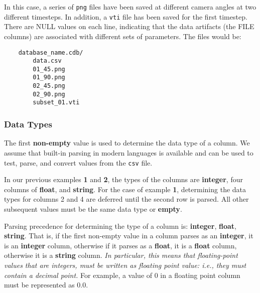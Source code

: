 \noindent
In this case, a series of \texttt{\small png} files have been saved at different
camera angles at two different timesteps. In addition, a \texttt{\small vti}
file has been saved for the first timestep. There are NULL values on each line,
indicating that the data artifacts (the FILE columns) are associated with
different sets of parameters. The files would be:

\begin{verbatim}
    database_name.cdb/
        data.csv
        01_45.png
        01_90.png
        02_45.png
        02_90.png
        subset_01.vti
\end{verbatim}

\subsubsection{Data Types}

The first \textbf{non-empty} value is used to determine the data type of a
column.  We assume that built-in parsing in modern languages is available and
can be used to test, parse, and convert values from the \texttt{\small csv}
file.

In our previous examples {\bf 1} and {\bf 2}, the types of the columns are 
\textbf{integer}, four columns of \textbf{float}, and \textbf{string}. For
the case of example {\bf 1}, determining the data types for columns 2 and 4 
are deferred until the second row is parsed. All other subsequent values must 
be the same data type or \textbf{empty}.

Parsing precedence for determining the type of a column is: \textbf{integer},
\textbf{float}, \textbf{string}. That is, if the first non-empty value in a
column parses as an \textbf{integer}, it is an \textbf{integer} column,
otherwise if it parses as a \textbf{float}, it is a \textbf{float} column,
otherwise it is a \textbf{string} column. \textit{In particular, this means
that floating-point values that are integers, must be written as floating point
value: i.e., they must contain a decimal point.} For example, a value of 0 in a
floating point column must be represented as 0.0.

